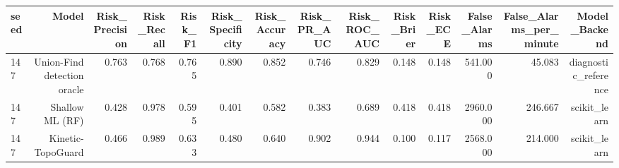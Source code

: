 \begin{tabular}{lrrrrrrrrrrrrr}
\toprule
seed & Model & Risk\_Precision & Risk\_Recall & Risk\_F1 & Risk\_Specificity & Risk\_Accuracy & Risk\_PR\_AUC & Risk\_ROC\_AUC & Risk\_Brier & Risk\_ECE & False\_Alarms & False\_Alarms\_per\_minute & Model\_Backend \\
\midrule
147 & Union-Find detection oracle & 0.763 & 0.768 & 0.765 & 0.890 & 0.852 & 0.746 & 0.829 & 0.148 & 0.148 & 541.000 & 45.083 & diagnostic\_reference \\
147 & Shallow ML (RF) & 0.428 & 0.978 & 0.595 & 0.401 & 0.582 & 0.383 & 0.689 & 0.418 & 0.418 & 2960.000 & 246.667 & scikit\_learn \\
147 & Kinetic-TopoGuard & 0.466 & 0.989 & 0.633 & 0.480 & 0.640 & 0.902 & 0.944 & 0.100 & 0.117 & 2568.000 & 214.000 & scikit\_learn \\
\bottomrule
\end{tabular}